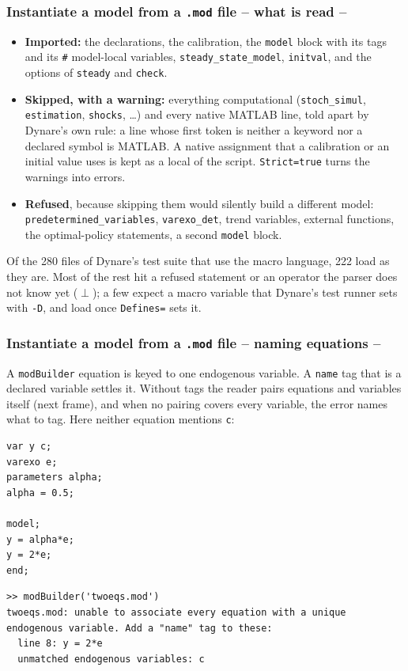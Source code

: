 \documentclass[10pt,slidestop]{beamer}
\theoremstyle{plain}
\begin{document}
\begin{frame}[fragile]
  \frametitle{Instantiate a model from a \texttt{.mod} file -- what is read --}

  \begin{itemize}
  \item \textbf{Imported:} the declarations, the calibration, the \texttt{model} block
    with its tags and its \texttt{\#} model-local variables, \texttt{steady\_state\_model},
    \texttt{initval}, and the options of \texttt{steady} and \texttt{check}.\newline
  \item \textbf{Skipped, with a warning:} everything computational
    (\texttt{stoch\_simul}, \texttt{estimation}, \texttt{shocks}, \dots) and every native
    MATLAB line, told apart by Dynare's own rule: a line whose first token is neither a
    keyword nor a declared symbol is MATLAB. A native assignment that a calibration or an
    initial value uses is kept as a local of the script.
    \texttt{Strict=true} turns the warnings into errors.\newline
  \item \textbf{Refused}, because skipping them would silently build a different model:
    \texttt{predetermined\_variables}, \texttt{varexo\_det}, trend variables, external
    functions, the optimal-policy statements, a second \texttt{model} block.
  \end{itemize}

  \medskip
  \small Of the 280 files of Dynare's test suite that use the macro language, 222 load
  as they are. Most of the rest hit a refused statement or an operator the parser does
  not know yet (\texttt{$\perp$}); a few expect a macro variable that Dynare's test
  runner sets with \texttt{-D}, and load once \texttt{Defines=} sets it.

\end{frame}


\begin{frame}[fragile]
  \frametitle{Instantiate a model from a \texttt{.mod} file -- naming equations --}

  A \texttt{modBuilder} equation is keyed to one endogenous variable. A \texttt{name}
  tag that is a declared variable settles it. Without tags the reader pairs equations
  and variables itself (next frame), and when no pairing covers every variable, the
  error names what to tag. Here neither equation mentions \texttt{c}:

  \begin{lstlisting}[language=Dynare,basicstyle=\scriptsize\ttfamily]
var y c;
varexo e;
parameters alpha;
alpha = 0.5;

model;
y = alpha*e;
y = 2*e;
end;
  \end{lstlisting}

  \begin{lstlisting}[style=MatlabConsole,basicstyle=\ttfamily\scriptsize]
>> modBuilder('twoeqs.mod')
twoeqs.mod: unable to associate every equation with a unique
endogenous variable. Add a "name" tag to these:
  line 8: y = 2*e
  unmatched endogenous variables: c
  \end{lstlisting}

\end{frame}
\end{document}
